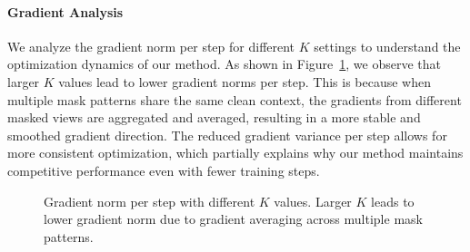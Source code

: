 \begin{table}[t]
\centering
{}
\caption{Ablation study of complementary masking of \name{} in AR to Diffusion setting.}
\label{tab:ar2diff_complementary_ablation}
\end{table}

\paragraph{Gradient Analysis}
We analyze the gradient norm per step for different $K$ settings to understand the optimization dynamics of our method.
As shown in Figure~\ref{fig:gradient_analysis}, we observe that larger $K$ values lead to lower gradient norms per step.
This is because when multiple mask patterns share the same clean context, the gradients from different masked views are aggregated and averaged, resulting in a more stable and smoothed gradient direction.
The reduced gradient variance per step allows for more consistent optimization, which partially explains why our method maintains competitive performance even with fewer training steps.

\begin{figure}[t]
\centering
\caption{Gradient norm per step with different $K$ values. Larger $K$ leads to lower gradient norm due to gradient averaging across multiple mask patterns.}
\label{fig:gradient_analysis}
\end{figure}

